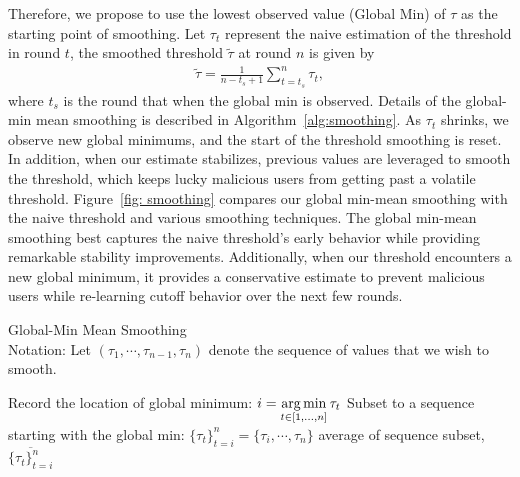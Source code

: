 \documentclass{article} %
\begin{document}
Therefore, we propose to use the lowest observed value (Global Min) of $\tau$ as the starting point of smoothing. Let $\tau_t$ represent the naive estimation of the threshold in round $t$, the smoothed threshold $\tilde{\tau}$ at round $n$ is given by
\begin{align*}
    \tilde{\tau} = \frac{1}{n-t_s+1}\sum_{t=t_s}^n \tau_t,
\end{align*}
where $t_s$ is the round that when the global min is observed. Details of the global-min mean smoothing is described in Algorithm~\ref{alg:smoothing}. As $\tau_t$ shrinks, we observe new global minimums, and the start of the threshold smoothing is reset. 
In addition, when our estimate stabilizes, previous values are leveraged to smooth the threshold, which keeps lucky malicious users from getting past a volatile threshold. Figure~\ref{fig: smoothing} compares our global min-mean smoothing with the naive threshold and various smoothing techniques.
The global min-mean smoothing best captures the naive threshold's early behavior while providing remarkable stability improvements. Additionally, when our threshold encounters a new global minimum, it provides a conservative estimate to prevent malicious users while re-learning cutoff behavior over the next few rounds.

\begin{algorithm}[H]
\caption{Global-Min Mean Smoothing \\ 
Notation: Let $(\tau_1, \cdots, \tau_{n - 1}, \tau_n)$ denote the sequence of values that we wish to smooth.
}
\label{alg:smoothing}
\begin{algorithmic}[1]

        \State Record the location of global minimum: $i = \operatorname*{arg\,min}\limits_{t \in [1,...,n] } \tau_t$
        \State Subset to a sequence starting with the global min: $\{\tau_t\}_{t=i}^n = \{\tau_i, \cdots, \tau_n \}$
        \State \Return average of sequence subset, $\overline{\{\tau_t\}_{t=i}^n}$
    \EndProcedure
\end{algorithmic}
\end{algorithm}
\end{document}
